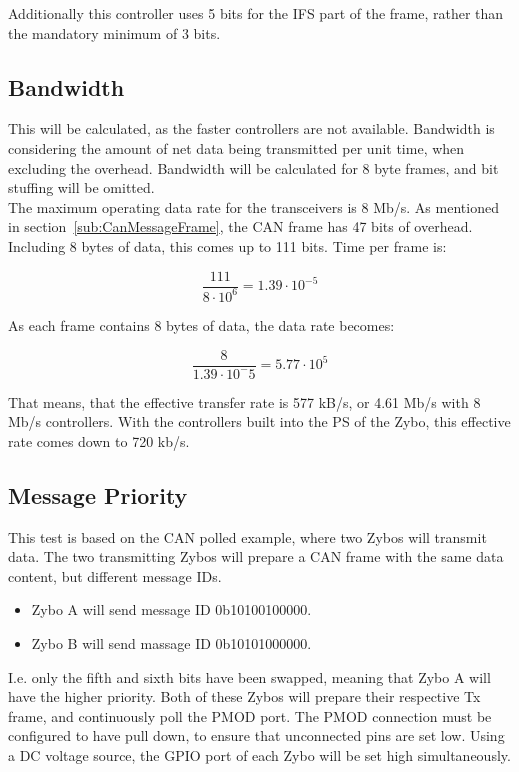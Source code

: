 Additionally this controller uses 5 bits for the IFS part of the frame, rather than the mandatory minimum of 3 bits. 

\subsection{Bandwidth}\label{sub:CAN_bandwidth}
This will be calculated, as the faster controllers are not available.
Bandwidth is considering the amount of net data being transmitted per unit time, when excluding the overhead.
Bandwidth will be calculated for 8 byte frames, and bit stuffing will be omitted.\\

The maximum operating data rate for the transceivers is 8 Mb/s.
As mentioned in section~\ref{sub:CanMessageFrame}, the CAN frame has 47 bits of overhead. 
Including 8 bytes of data, this comes up to 111 bits. 
Time per frame is:

\begin{equation}
\frac{111}{8 \cdot 10^6} = 1.39 \cdot 10^{-5}
\end{equation}

As each frame contains 8 bytes of data, the data rate becomes:

\begin{equation}
\frac{8}{1.39 \cdot 10^-5}= 5.77 \cdot 10^5
\end{equation}

That means, that the effective transfer rate is 577 kB/s, or 4.61 Mb/s with 8 Mb/s controllers. 
With the controllers built into the PS of the Zybo, this effective rate comes down to 720 kb/s.

\subsection{Message Priority}\label{sub:CAN_message priority}
This test is based on the CAN polled example, where two Zybos will transmit data.
The two transmitting Zybos will prepare a CAN frame with the same data content, but different message IDs.
\begin{itemize}
	\item Zybo A will send message ID 0b10100100000.
	\item Zybo B will send massage ID 0b10101000000.
\end{itemize}
I.e. only the fifth and sixth bits have been swapped, meaning that Zybo A will have the higher priority.
Both of these Zybos will prepare their respective Tx frame, and continuously poll the PMOD port.
The PMOD connection must be configured to have pull down, to ensure that unconnected pins are set low.
Using a DC voltage source, the GPIO port of each Zybo will be set high simultaneously.\\

